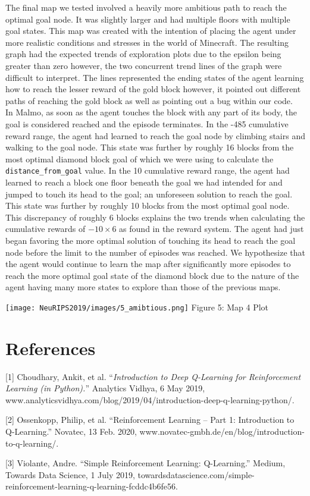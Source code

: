 \documentclass{article}
\begin{document}
The final map we tested involved a heavily more ambitious path to reach the optimal goal node. It was slightly larger and had multiple floors with multiple goal states. This map was created with the intention of placing the agent under more realistic conditions and stresses in the world of Minecraft. The resulting graph had the expected trends of exploration plots due to the epsilon being greater than zero however, the two concurrent trend lines of the graph were difficult to interpret. The lines represented the ending states of the agent learning how to reach the lesser reward of the gold block however, it pointed out different paths of reaching the gold block as well as pointing out a bug within our code. \\
In Malmo, as soon as the agent touches the block with any part of its body, the goal is considered reached and the episode terminates. In the -485 cumulative reward range, the agent had learned to reach the goal node by climbing stairs and walking to the goal node. This state was further by roughly 16 blocks from the most optimal diamond block goal of which we were using to calculate the \verb|distance_from_goal| value. In the 10 cumulative reward range, the agent had learned to reach a block one floor beneath the goal we had intended for and jumped to touch its head to the goal; an unforeseen solution to reach the goal. This state was further by roughly 10 blocks from the most optimal goal node. This discrepancy of roughly 6 blocks explains the two trends when calculating the cumulative rewards of $-10 \times 6$ as found in the reward system. The agent had just began favoring the more optimal solution of touching its head to reach the goal node before the limit to the number of episodes was reached. We hypothesize that the agent would continue to learn the map after significantly more episodes to reach the more optimal goal state of the diamond block due to the nature of the agent having many more states to explore than those of the previous maps.
\begin{center}
    \texttt{[image: NeuRIPS2019/images/5\_amibtious.png]}
    \center Figure 5: Map 4 Plot
\end{center}


\section*{References}
\small
[1] Choudhary, Ankit, et al. “\emph{Introduction to Deep Q-Learning for Reinforcement Learning (in Python).}” Analytics Vidhya, 6 May 2019, www.analyticsvidhya.com/blog/2019/04/introduction-deep-q-learning-python/.

[2] Ossenkopp, Philip, et al. “Reinforcement Learning – Part 1: Introduction to Q-Learning.” 
Novatec, 13 Feb. 2020, www.novatec-gmbh.de/en/blog/introduction-to-q-learning/. 

[3] Violante, Andre. “Simple Reinforcement Learning: Q-Learning.” Medium, Towards Data Science, 1 July 2019, towardsdatascience.com/simple-reinforcement-learning-q-learning-fcddc4b6fe56.
\end{document}
